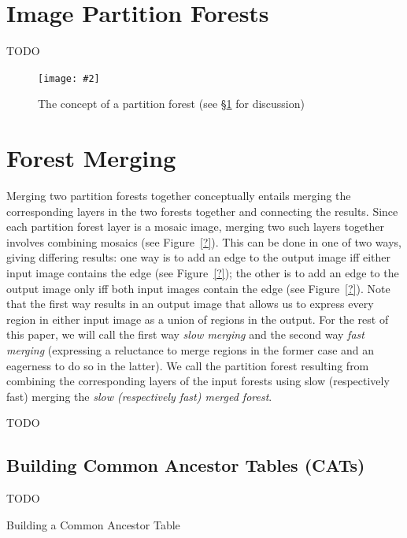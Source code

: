 \documentclass[10pt,twocolumn,twoside]{IEEEtran}
\newcommand{\stufigex}[5]					%
{
	\begin{figure}[#5]
	\begin{center}
		\texttt{[image: \#2]}
		\caption{#3}
		\label{#4}
	\end{center}
	\end{figure}
}
\begin{document}
\section{Image Partition Forests}
\label{sec:ipfs}

TODO

\stufigex{width=.75\linewidth}{ipfs-concept.png}{The concept of a partition forest (see \S\ref{sec:ipfs} for discussion)}{fig:ipfs-concept}{!t}

\section{Forest Merging}
\label{sec:merging}

Merging two partition forests together conceptually entails merging the corresponding layers in the two forests together and connecting the results. Since each partition forest layer is a mosaic image, merging two such layers together involves combining mosaics (see Figure~\ref{?}). This can be done in one of two ways, giving differing results: one way is to add an edge to the output image iff either input image contains the edge (see Figure~\ref{?}); the other is to add an edge to the output image only iff both input images contain the edge (see Figure~\ref{?}). Note that the first way results in an output image that allows us to express every region in either input image as a union of regions in the output. For the rest of this paper, we will call the first way \emph{slow merging} and the second way \emph{fast merging} (expressing a reluctance to merge regions in the former case and an eagerness to do so in the latter). We call the partition forest resulting from combining the corresponding layers of the input forests using slow (respectively fast) merging the \emph{slow (respectively fast) merged forest}.

TODO

\subsection{Building Common Ancestor Tables (CATs)}

TODO

\begin{stulisting}[t]
\caption{Building a Common Ancestor Table}
\label{code:build-cat}

\end{stulisting}
\end{document}
